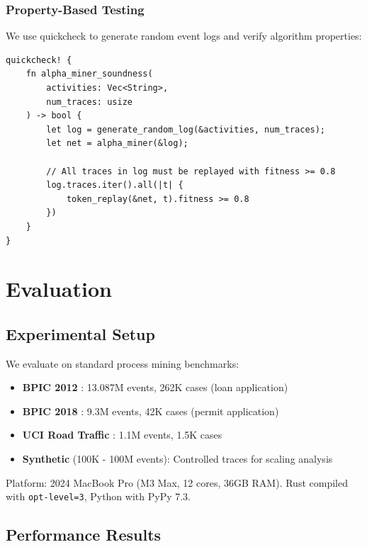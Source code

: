 \documentclass[11pt,twocolumn]{article}
\begin{document}
\subsubsection{Property-Based Testing}
We use quickcheck to generate random event logs and verify algorithm properties:

\begin{lstlisting}
quickcheck! {
    fn alpha_miner_soundness(
        activities: Vec<String>,
        num_traces: usize
    ) -> bool {
        let log = generate_random_log(&activities, num_traces);
        let net = alpha_miner(&log);

        // All traces in log must be replayed with fitness >= 0.8
        log.traces.iter().all(|t| {
            token_replay(&net, t).fitness >= 0.8
        })
    }
}
\end{lstlisting}

\section{Evaluation}
\label{sec:evaluation}

\subsection{Experimental Setup}
We evaluate on standard process mining benchmarks:

\begin{itemize}
    \item \textbf{BPIC 2012} \cite{bpic2012}: 13.087M events, 262K cases (loan application)
    \item \textbf{BPIC 2018} \cite{bpic2018}: 9.3M events, 42K cases (permit application)
    \item \textbf{UCI Road Traffic} \cite{uci2014}: 1.1M events, 1.5K cases
    \item \textbf{Synthetic} (100K - 100M events): Controlled traces for scaling analysis
\end{itemize}

Platform: 2024 MacBook Pro (M3 Max, 12 cores, 36GB RAM). Rust compiled with \texttt{opt-level=3}, Python with PyPy 7.3.

\subsection{Performance Results}
\end{document}
